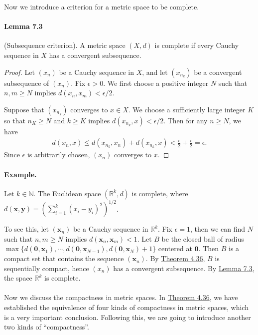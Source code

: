 \documentclass{article}
\numberwithin{equation}{section}
\theoremstyle{plain}
\theoremstyle{definition}
\begin{document}
Now we introduce a criterion for a metric space to be complete.

\paragraph{Lemma 7.3\label{lemma:7.3}} (Subsequence criterion).  A metric space $(X,d)$ is complete if every Cauchy sequence in $X$ has a convergent subsequence.
\begin{proof}
Let $(x_n)$ be a Cauchy sequence in $X$, and let $(x_{n_k})$ be a convergent subsequence of $(x_n)$. Fix $\epsilon > 0$. We first choose a positive integer $N$ such that $n,m\geq N$ implies $d(x_n,x_m)<\epsilon / 2$.

Suppose that $(x_{n_k})$ converges to $x\in X$. We choose a sufficiently large integer $K$ so that $n_K\geq N$ and $k\geq K$ implies $d(x_{n_k},x)<\epsilon/2$. Then for any $n\geq N$, we have
\begin{align*}
	d(x_n,x) \leq d(x_{n_k},x_n) + d(x_{n_k},x) < \frac{\epsilon}{2} + \frac{\epsilon}{2} = \epsilon.
\end{align*}
Since $\epsilon$ is arbitrarily chosen, $(x_n)$ converges to $x$.
\end{proof}

\paragraph{Example.} Let $k\in\mathbb{N}$. The Euclidean space $(\mathbb{R}^k,d)$ is complete, where $d(\mathbf{x},\mathbf{y}) = \left(\sum_{i=1}^k (x_i-y_i)^2\right)^{1/2}$.

To see this, let $(\mathbf{x}_n)$ be a Cauchy sequence in $\mathbb{R}^k$. Fix $\epsilon = 1$, then we can find $N$ such that $n,m\geq N$ implies $d(\mathbf{x}_n,\mathbf{x}_m)<1$. Let $B$ be the closed ball of radius $\max\{d(\mathbf{0},\mathbf{x}_1),\cdots,d(\mathbf{0},\mathbf{x}_{N-1}),d(\mathbf{0},\mathbf{x}_N)+1\}$ centered at $\mathbf{0}$. Then $B$ is a compact set that contains the sequence $(\mathbf{x}_n)$. By \hyperref[thm:4.36]{Theorem 4.36}, $B$ is sequentially compact, hence $(x_n)$ has a convergent subsequence. By \hyperref[lemma:7.3]{Lemma 7.3}, the space $\mathbb{R}^k$ is complete.

\paragraph{} Now we discuss the compactness in metric spaces. In \hyperref[thm:4.36]{Theorem 4.36}, we have established the equivalence of four kinds of compactness in metric spaces, which is a very important conclusion. Following this, we are going to introduce another two kinds of ``compactness''.
\end{document}
